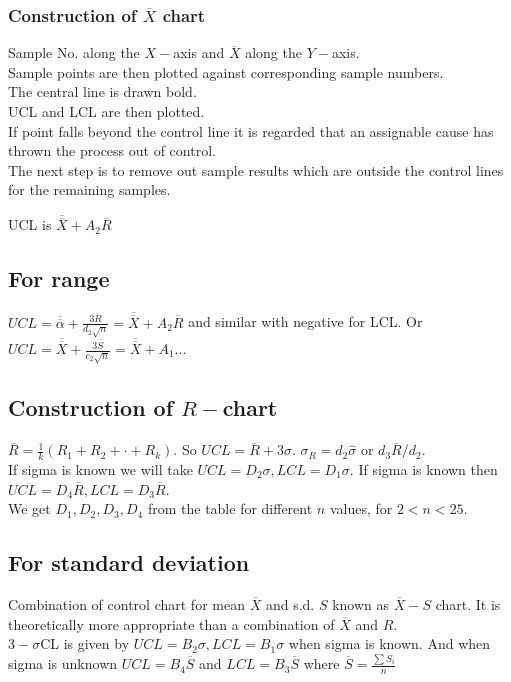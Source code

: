 \documentclass[oneside,11pt,pdftex]{book}%
\numberwithin{equation}{section}
\numberwithin{section}{chapter}
\numberwithin{equation}{chapter}
\begin{document}
\subsubsection{Construction of $ \overline{X} $ chart} 
Sample No. along the $ X- $axis and $ \overline{X} $ along the $ Y- $axis.\\
Sample points are then plotted against corresponding sample numbers.\\
The central line is drawn bold.\\
UCL and LCL are then plotted.\\
If point falls beyond the control line it is regarded that an assignable cause has thrown the process out of control.\\
The next step is to remove out sample results which are outside the control lines for the remaining samples.

UCL is $ \overline{\overline{X}}+A_2 \overline{R} $
\subsection{For range}
$ UCL=\overline{\overline{\alpha}}+\frac{3\overline{R}}{d_2 \sqrt{n}} =\overline{\overline{X}}+A_2 \overline{R}$ and similar with negative for LCL. 
Or $ UCL=\overline{\overline{X}} +\frac{3 \overline{S}}{c_2 \sqrt{n}}=\overline{\overline{X}}+A_1...$

\subsection{Construction of $ R- $chart}
$ \overline{R} =\frac{1}{k}(R_1+R_2+\cdot+R_k)$. So $ UCL=\overline{R} + 3 \sigma$. $ \sigma_R=d_2\hat{\sigma }$ or $ d_3 \overline{R} /d_2 $.\\
If sigma is known we will take $ UCL=D_2 \sigma, LCL=D_1 \sigma  $. If sigma is known then $ UCL=D_4\overline{R}, LCL= D_3 \overline{R}$.\\
We get $ D_1,D_2,D_3,D_4  $ from the table for different $ n $ values, for $ 2<n<25 $.
\subsection{For standard deviation}
Combination of control chart for mean $ \overline{X} $ and s.d. $ S $ known as $ \overline{X} -S$ chart. It is theoretically more appropriate than a combination of $ \overline{X}$ and $ R $.\\
$ 3-\sigma  $CL is given by $ UCL=B_2 \sigma, LCL=B_1 \sigma $ when sigma is known. And when sigma is unknown $ UCL=B_4 \overline{S} $ and $ LCL=B_3 \overline{S} $ where $ \overline{S} = \frac{\sum S_i}{n}$
\end{document}
